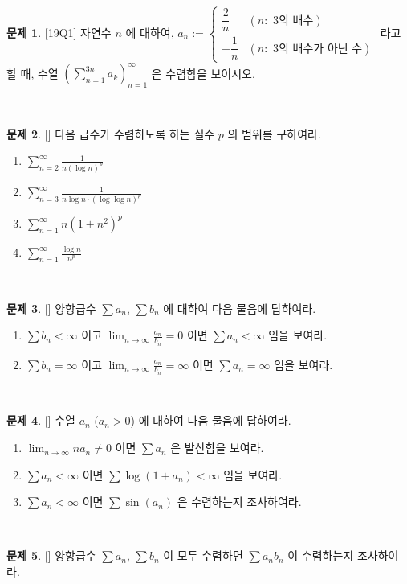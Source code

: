 \documentclass[12pt]{article}
\newcommand{\ds}{\displaystyle}
\theoremstyle{definition}
\newtheorem{problem}{\sffamily 문제}[section]
\newcommand{\prob}[2]{\begin{problem}{[\sffamily #1]} #2\end{problem}~}
\begin{document}
\prob{19Q1}{자연수 $n$ 에 대하여, $ a_n:=\begin{cases}
\dfrac{2}{n} & (n : \text{ 3의 배수})\\
-\dfrac{1}{n} & (n : \text { 3의 배수가 아닌 수})
\end{cases}$ 라고 할 때, 수열 $\displaystyle \left(\sum_{n=1}^{3n} a_k\right)_{n=1}^\infty$ 은 수렴함을 보이시오.
}

\prob{1}{다음 급수가 수렴하도록 하는 실수 $p$ 의 범위를 구하여라.
\begin{enumerate}
	\item $\ds \sum_{n=2}^\infty \frac{1}{n(\log n)^p}$
	\item $\ds \sum_{n=3}^\infty \frac{1}{n\log n\cdot (\log\log n)^p}$
	\item $\ds \sum_{n=1}^\infty n(1+n^2)^p$
	\item $\ds \sum_{n=1}^\infty \frac{\log n}{n^p}$
\end{enumerate}
}

\prob{1}{양항급수 $\ds \sum a_n$, $\ds \sum b_n$ 에 대하여 다음 물음에 답하여라.
\begin{enumerate}
	\item $\ds \sum b_n <\infty$ 이고 $\ds \lim_{n \rightarrow \infty} \frac{a_n}{b_n} = 0$ 이면 $\ds \sum a_n < \infty$ 임을 보여라.
	\item $\ds \sum b_n = \infty$ 이고 $\ds \lim_{n \rightarrow \infty} \frac{a_n}{b_n} = \infty$ 이면 $\ds \sum a_n = \infty$ 임을 보여라.
\end{enumerate}
}

\prob{1}{수열 $a_n$ ($a_n>0$) 에 대하여 다음 물음에 답하여라.
\begin{enumerate}
	\item $\ds \lim_{n \rightarrow \infty} na_n\neq 0$ 이면 $\ds \sum a_n$ 은 발산함을 보여라.
	\item $\ds\sum a_n<\infty$ 이면 $\ds \sum \log(1+a_n) < \infty$ 임을 보여라.
	\item $\ds\sum a_n<\infty$ 이면 $\ds \sum \sin(a_n)$ 은 수렴하는지 조사하여라.
\end{enumerate}
}

\prob{1}{양항급수 $\ds \sum a_n$, $\ds \sum b_n$ 이 모두 수렴하면 $\ds\sum a_nb_n$ 이 수렴하는지 조사하여라.}
\end{document}
